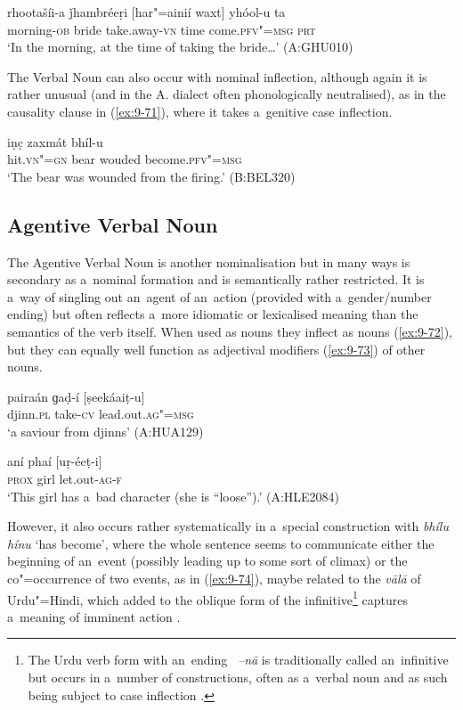 \begin{exe}
\ex
\label{ex:9-70}
\gll rhootašíi-a ǰhambréeṛi [har"=ainií waxt] yhóol-u ta \\
morning-\textsc{ob} bride take.away-\textsc{vn} time come.\textsc{pfv"=msg} \textsc{prt} \\
\glt `In the morning, at the time of taking the bride{\ldots}' (A:GHU010)
\end{exe}

The Verbal Noun can also occur with nominal inflection, although again it is rather unusual (and in the A. dialect often phonologically neutralised), as in the causality clause in (\ref{ex:9-71}), where it takes a~genitive case inflection. 

\begin{exe}
\ex
\label{ex:9-71}
\gll [ǰeníi-e] iṇc̣ zaxmát bhíl-u \\
hit.\textsc{vn"=gn} bear wouded become.\textsc{pfv"=msg} \\
\glt `The bear was wounded from the firing.' (B:BEL320)
\end{exe}

\subsection{Agentive Verbal Noun}
\label{subsec:9-3-4}


The Agentive Verbal Noun is another nominalisation but in many ways is secondary as a~nominal formation and is semantically rather restricted. It is a~way of singling out an~agent of an~action (provided with a~gender/number ending) but often reflects a~more idiomatic or lexicalised meaning than the semantics of the verb itself. When used as nouns they inflect as nouns (\ref{ex:9-72}), but they can equally well function as adjectival modifiers (\ref{ex:9-73}) of other nouns.

\begin{exe}
\ex
\label{ex:9-72}
\gll pairaán ɡaḍ-í [ṣeekáaiṭ-u] \\
djinn.\textsc{pl} take-\textsc{cv} lead.out.\textsc{ag"=msg} \\
\glt `a saviour from djinns' (A:HUA129)

\ex
\label{ex:9-73}
\gll aní phaí [uṛ-éeṭ-i] \\
\textsc{prox} girl let.out-\textsc{ag-f} \\
\glt `This girl has a~bad character (she is ``loose'').' (A:HLE2084)
\end{exe}

However, it also occurs rather systematically in a~special construction with \textit{bhílu hínu} `has become', where the whole sentence seems to communicate either the beginning of an~event (possibly leading up to some sort of climax) or the co"=occurrence of two events, as in (\ref{ex:9-74}), maybe related to the \textit{vālā} of Urdu"=Hindi, which added to the oblique form of the infinitive\footnote{The Urdu verb form with an~ending \textit{~--nā} is traditionally called an~infinitive but occurs in a~number of constructions, often as a~verbal noun and as such being subject to case inflection \citep[132--142]{schmidt1999}.} captures a~meaning of imminent action \citep[139]{schmidt1999}. 

